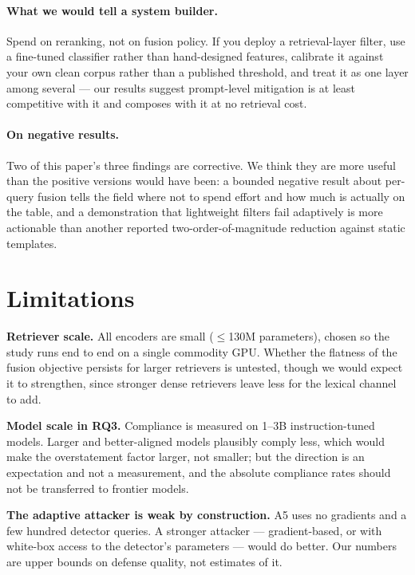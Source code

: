 \documentclass{article}
\begin{document}
\paragraph{What we would tell a system builder.} Spend on reranking, not on
fusion policy. If you deploy a retrieval-layer filter, use a fine-tuned
classifier rather than hand-designed features, calibrate it against your own
clean corpus rather than a published threshold, and treat it as one layer among
several --- our results suggest prompt-level mitigation is at least competitive
with it and composes with it at no retrieval cost.

\paragraph{On negative results.} Two of this paper's three findings are
corrective. We think they are more useful than the positive versions would have
been: a bounded negative result about per-query fusion tells the field where not
to spend effort and how much is actually on the table, and a demonstration that
lightweight filters fail adaptively is more actionable than another reported
two-order-of-magnitude reduction against static templates.

\section{Limitations}

\textbf{Retriever scale.} All encoders are small ($\leq$130M parameters), chosen
so the study runs end to end on a single commodity GPU. Whether the flatness of
the fusion objective persists for larger retrievers is untested, though we would
expect it to strengthen, since stronger dense retrievers leave less for the
lexical channel to add.

\textbf{Model scale in RQ3.} Compliance is measured on 1--3B instruction-tuned
models. Larger and better-aligned models plausibly comply less, which would make
the overstatement factor larger, not smaller; but the direction is an
expectation and not a measurement, and the absolute compliance rates should not
be transferred to frontier models.

\textbf{The adaptive attacker is weak by construction.} A5 uses no gradients and
a few hundred detector queries. A stronger attacker --- gradient-based, or with
white-box access to the detector's parameters --- would do better. Our numbers
are upper bounds on defense quality, not estimates of it.
\end{document}
